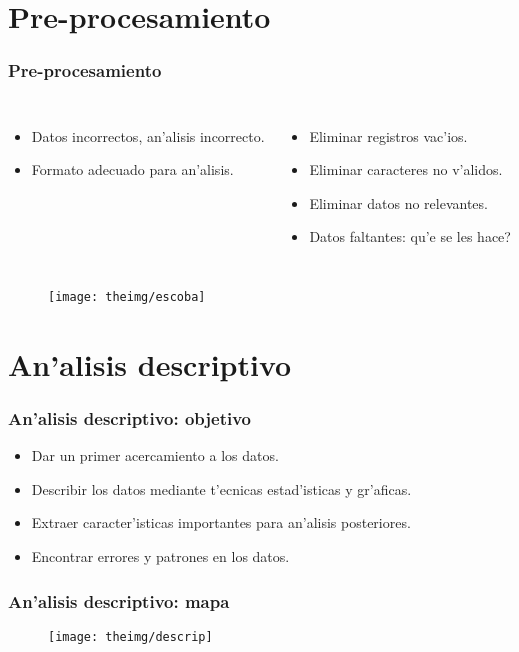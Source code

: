 \documentclass{beamer}
\begin{document}
\section{Pre-procesamiento}
\begin{frame}[label=prepro]
\frametitle{Pre-procesamiento}
\vspace{0.3cm}
\begin{columns}[T]
    \begin{itemize}
    \item Datos incorrectos, an'alisis incorrecto.
    \item Formato adecuado para an'alisis.
    \end{itemize}
        
    \begin{itemize}
    \item Eliminar registros vac'ios.
    \item Eliminar caracteres no v'alidos.
    \item Eliminar datos no relevantes.
    \item Datos faltantes: \textquestiondown qu'e se les hace?
    \end{itemize}     
\end{columns}
\vspace{0.3cm}
\begin{figure}[h]
    \centering
    \texttt{[image: theimg/escoba]}
    \end{figure}
\end{frame}
\section{An'alisis descriptivo}
\begin{frame}[label=objetivoda]
\frametitle{An'alisis descriptivo: objetivo}
\begin{itemize}
    \setlength\itemsep{0.7cm}
    \item Dar un primer acercamiento a los datos.
    \item Describir los datos mediante t'ecnicas estad'isticas y gr'aficas.
    \item Extraer caracter'isticas importantes para an'alisis posteriores.
    \item Encontrar errores y patrones en los datos.
    \end{itemize}   
\end{frame} 
\begin{frame}[label=da]
\frametitle{An'alisis descriptivo: mapa}
\begin{figure}[h]
    \centering
    \texttt{[image: theimg/descrip]}
    \vspace{0.2cm}
    \color{mynavyblue}\begin{tiny}[Sayad, 2010]\end{tiny}
\end{figure}
\end{frame} 
\end{document}
